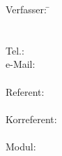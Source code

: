
\title{\haupttitel }
\author{\verfasser}
\date{\today}


\pagestyle {fancy}

\fancyhead[L]{\fontsize{10pt}{12pt}\selectfont\verfasser}
\fancyhead[C]{}
\fancyhead[R]{}

\fancyfoot[L]{}
\fancyfoot[C]{}
\fancyfoot[R]{\thepage}




\pagestyle{empty}

\begin{center}
    \LARGE
    \vspace{4cm}
    
    {\huge\bfseries \haupttitel \par}
	\vspace{1cm}
	{\bfseries \untertitel \par}

\end{center}

\vspace*{\fill}

\begin{tabbing}

	Verfasser\verfassergen :  
	\hspace{2.5cm}  \= \verfasser \\
	\> \strasse \\
	\> \ort \\
	\> Tel.: \tel \\
	\> e-Mail: \mail \\
	 \\

	Referent :
	\>  \\
	\\
	
	Korreferent\korreferentgen :
	\> \korreferent \\
	\\
	
	Modul:
	\> \modul \\
	\\
\end{tabbing}

\ \\
\centerline{\textbf{\titlefooter}}



    \newpage
    
     \pagestyle{fancy}
